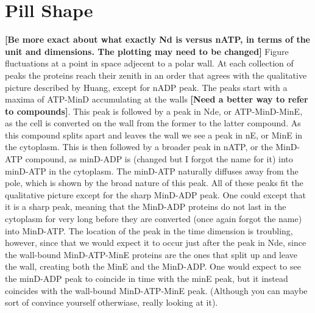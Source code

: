 \documentclass[letterpaper,twocolumn,amsmath,amssymb,pre]{revtex4-1}
\newcommand{\red}[1]{{\bf \color{red} #1}}
\newcommand{\fixme}[1]{\red{[#1]}}
\begin{document}
\section{Pill Shape}
\fixme{Be more exact about what exactly Nd is versus nATP, in terms of
  the unit and dimensions.  The plotting may need to be changed}
Figure %
fluctuations at a point in space adjecent to a polar wall.  At each
collection of peaks the proteins reach their zenith in an order that
agrees with the qualitative picture described by
Huang\cite{huang2003dynamic}, except for nADP peak.  The peaks start
with a maxima of ATP-MinD accumulating at the walls \fixme{Need a
  better way to refer to compounds}. This peak is followed by a peak
in Nde, or ATP-MinD-MinE, as the cell is converted on the wall from
the former to the latter compound.  As this compound splits apart and
leaves the wall we see a peak in nE, or MinE in the cytoplasm.  This
is then followed by a broader peak in nATP, or the MinD-ATP compound,
as minD-ADP is (changed but I forgot the name for it) into minD-ATP in
the cytoplasm.  The minD-ATP naturally diffuses away from the pole,
which is shown by the broad nature of this peak.  All of these peaks
fit the qualitative picture except for the sharp MinD-ADP peak.  One
could except that it is a sharp peak, meaning that the MinD-ADP proteins
do not last in the cytoplasm for very long before they are converted
(once again forgot the name) into MinD-ATP.  The location of the peak
in the time dimension is troubling, however, since that we would
expect it to occur just after the peak in Nde, since the wall-bound
MinD-ATP-MinE proteins are the ones that split up and leave the wall,
creating both the MinE and the MinD-ADP.  One would expect to see the
minD-ADP peak to coincide in time with the minE peak, but it instead
coincides with the wall-bound MinD-ATP-MinE peak. (Although you can
maybe sort of convince yourself otherwiase, really looking at it).

\end{document}

